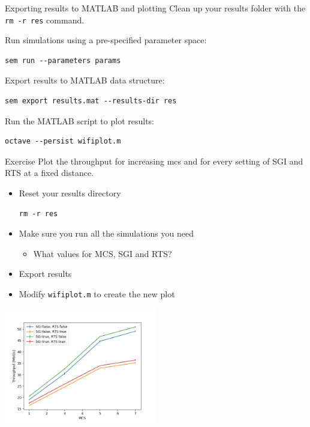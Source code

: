 \documentclass[presentation]{beamer}
\begin{document}
\begin{frame}[label={sec:org0cabe5d},fragile]{Exporting results to MATLAB and plotting}
 Clean up your results folder with the \texttt{rm -r res} command.

Run simulations using a pre-specified parameter space:

\begin{verbatim}
sem run --parameters params
\end{verbatim}

Export results to MATLAB data structure:

\begin{verbatim}
sem export results.mat --results-dir res
\end{verbatim}

Run the MATLAB script to plot results:

\begin{verbatim}
octave --persist wifiplot.m
\end{verbatim}
\end{frame}

\begin{frame}[label={sec:orga3cccc6},fragile]{Exercise}
 \alert{Plot the throughput for increasing mcs and for every setting of SGI and RTS
at a fixed distance.}

\begin{itemize}
\item Reset your results directory
\begin{verbatim}
rm -r res
\end{verbatim}
\item Make sure you run all the simulations you need
\begin{itemize}
\item What values for MCS, SGI and RTS?
\end{itemize}
\item Export results
\item Modify \texttt{wifiplot.m} to create the new plot
\end{itemize}

\begin{center}
\includegraphics[width=0.5\textwidth]{mcssgirts.png}
\end{center}
\end{frame}
\end{document}
